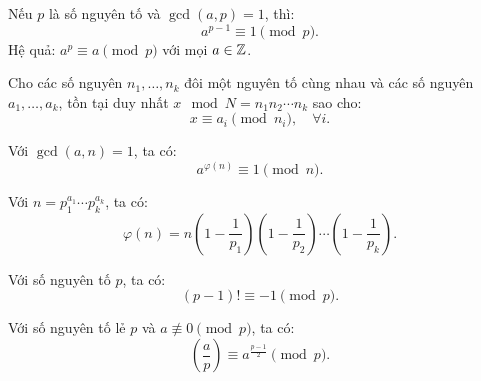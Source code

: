 \documentclass[../imo-training-open-book.tex]{subfiles}
\begin{document}
\vspace{1em}

\begin{theorem*}
    \label{theorem:fermat-little}
    Nếu \( p \) là số nguyên tố và \( \gcd(a, p) = 1 \), thì:
    \[
        a^{p-1} \equiv 1 \pmod{p}.
    \]
    Hệ quả: \( a^p \equiv a \pmod{p} \) với mọi \( a \in \mathbb Z \).
\end{theorem*}

\vspace{1em}

\begin{theorem*}
    \label{theorem:chinese-remainder-theorem}
    Cho các số nguyên \( n_1, \dots, n_k \) đôi một nguyên tố cùng nhau và các số nguyên \( a_1, \dots, a_k \), tồn tại duy nhất \( x \mod N = n_1n_2\cdots n_k \) sao cho:
    \[
        x \equiv a_i \pmod{n_i},\quad \forall i.
    \]
\end{theorem*}

\vspace{1em}

\begin{theorem*}
    \label{theorem:euler}
    Với \( \gcd(a, n) = 1 \), ta có:
    \[
        a^{\varphi(n)} \equiv 1 \pmod{n}.
    \]
\end{theorem*}

\vspace{1em}

\begin{definition*}
    \label{definition:euler-totient}
    Với \( n = p_1^{a_1} \cdots p_k^{a_k} \), ta có:
    \[
        \varphi(n) = n\left(1 - \frac{1}{p_1} \right)\left(1 - \frac{1}{p_2} \right) \cdots \left(1 - \frac{1}{p_k} \right).
    \]
\end{definition*}

\vspace{1em}

\begin{theorem*}
    \label{theorem:wilson}
    Với số nguyên tố \( p \), ta có:
    \[
        (p - 1)! \equiv -1 \pmod{p}.
    \]
\end{theorem*}

\vspace{1em}

\begin{theorem*}
    \label{theorem:euler-criterion}
    Với số nguyên tố lẻ \( p \) và \( a \not\equiv 0 \pmod{p} \), ta có:
    \[
        \left( \frac{a}{p} \right) \equiv a^{\frac{p - 1}{2}} \pmod{p}.
    \]
\end{theorem*}
\end{document}
